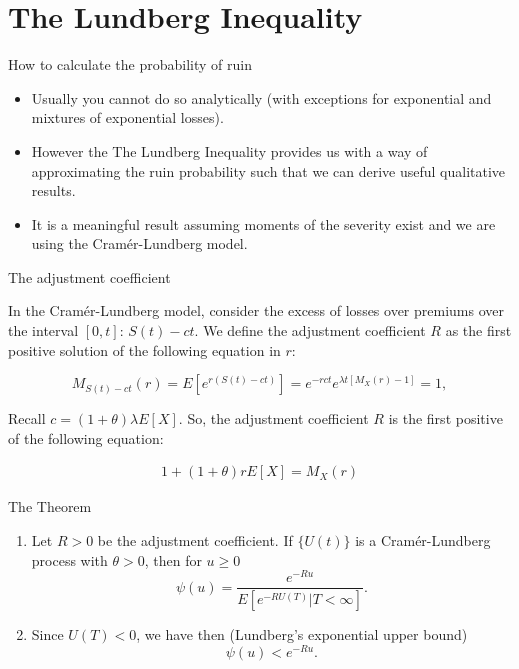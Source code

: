 \documentclass[11pt]{beamer}
\begin{document}
\section{The Lundberg Inequality}
\begin{frame}{How to calculate the probability of ruin}

\begin{itemize}

\item Usually you cannot do so analytically (with exceptions for exponential and mixtures of exponential losses).

\vfill

\item However the \alert{The Lundberg Inequality} provides us with a way of approximating the ruin probability such that we can derive useful qualitative results. 

\vfill

\item It is a meaningful result assuming moments of the severity exist and we are using the Cram\'er-Lundberg model.

\end{itemize}

\end{frame}
\begin{frame}{The adjustment coefficient}

In the Cram\'er-Lundberg model, consider the excess of losses over premiums over the interval $[0,t]$: $S(t)-ct.$ We define the \alert{adjustment coefficient $R$} as the first positive solution of the following equation in $r$:


$$M_{S(t)-ct}(r)=E\left[ e^{r(S(t)-ct)} \right]=e^{-rct}e^{\lambda t [M_X(r)-1]}=1,$$

\vfill

Recall $c = (1 + \theta) \lambda E[X]$. So, the adjustment coefficient $R$ is the first positive of the following equation:

\begin{eqnarray*}
1+(1+\theta) rE[X] = M_X(r)
\end{eqnarray*}


\end{frame}
\begin{frame}{The Theorem}
\begin{enumerate}
\item Let $R > 0$ be the adjustment coefficient. If $\{U(t)\}$ is a Cram\'er-Lundberg process with $\theta>0$, then for $u\ge 0$
$$\psi(u)=\frac{e^{-Ru}}{E\left[ e^{-R U(T)} | T<\infty\right]}.$$
\item Since $U(T)<0$, we have then (Lundberg's exponential upper bound)
$$\psi(u)< e^{-Ru}.$$
\end{enumerate}
\end{frame}
\end{document}
